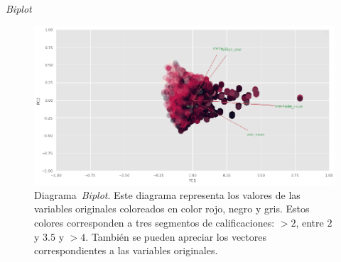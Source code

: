 \documentclass[11pt,a4paper,twoside]{thesis}
\begin{document}
\clearpage

\begin{description}
	\item[\textit{Biplot}]
\end{description}

\begin{figure}[h!]
	\centering
	\includegraphics[width=15cm]{./images/PCA-biplot.png}
	\caption{Diagrama~\cite{biplot}\textit{Biplot}. Este diagrama representa los valores de
		las variables originales coloreados en color rojo, negro y gris.
		Estos colores corresponden a tres segmentos de calificaciones: $>2$, entre $2$ y $3.5$ y $>4$. También se pueden apreciar los vectores correspondientes a las variables originales.}
	\label{fig:biplot}
\end{figure}
\end{document}

